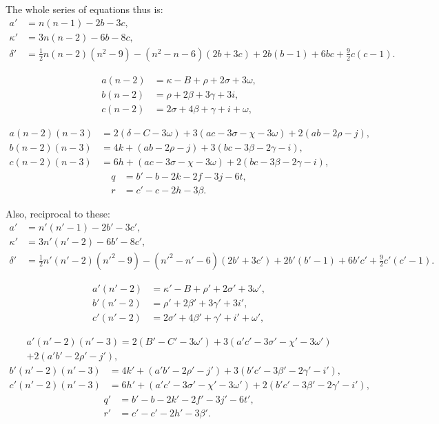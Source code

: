 \documentclass[11pt,a4paper]{article}
\theoremstyle{plain}
\theoremstyle{definition}
\theoremstyle{remark}
\begin{document}
The whole series of equations thus is:
\begin{align}
a' &= n(n-1)-2b-3c,\\
\kappa' &= 3n(n-2)-6b-8c,\\
\delta' &= \tfrac{1}{2}n(n-2)(n^2-9)-(n^2-n-6)(2b+3c)+2b(b-1)+6bc+\tfrac{9}{2}c(c-1).
\end{align}

\begin{align}
a(n-2) &= \kappa-B+\rho+2\sigma+3\omega,\tag{7}\\
b(n-2) &= \rho+2\beta+3\gamma+3i,\tag{8}\\
c(n-2) &= 2\sigma+4\beta+\gamma+i+\omega,\tag{9}
\end{align}

\begin{align}
a(n-2)(n-3) &= 2(\delta-C-3\omega)+3(ac-3\sigma-\chi-3\omega)+2(ab-2\rho-j),\tag{10}\\
b(n-2)(n-3) &= 4k+(ab-2\rho-j)+3(bc-3\beta-2\gamma-i),\tag{11}\\
c(n-2)(n-3) &= 6h+(ac-3\sigma-\chi-3\omega)+2(bc-3\beta-2\gamma-i),\tag{12}
\end{align}
\begin{align}
q &= b'-b-2k-2f-3j-6t,\tag{13}\\
r &= c'-c-2h-3\beta.\tag{14}
\end{align}

\newpage
\setcounter{page}{615}

Also, reciprocal to these:
\begin{align}
a' &= n'(n'-1)-2b'-3c',\tag{15}\\
\kappa' &= 3n'(n'-2)-6b'-8c',\tag{16}\\
\delta' &= \tfrac{1}{2}n'(n'-2)(n'^2-9)-(n'^2-n'-6)(2b'+3c')+2b'(b'-1)+6b'c'+\tfrac{9}{2}c'(c'-1).\tag{17}
\end{align}

\begin{align}
a'(n'-2) &= \kappa'-B+\rho'+2\sigma'+3\omega',\tag{18}\\
b'(n'-2) &= \rho'+2\beta'+3\gamma'+3i',\tag{19}\\
c'(n'-2) &= 2\sigma'+4\beta'+\gamma'+i'+\omega',\tag{20}
\end{align}

\begin{multline}
a'(n'-2)(n'-3) = 2(B'-C'-3\omega')+3(a'c'-3\sigma'-\chi'-3\omega')\\
+2(a'b'-2\rho'-j'),\tag{21}
\end{multline}
\begin{align}
b'(n'-2)(n'-3) &= 4k'+(a'b'-2\rho'-j')+3(b'c'-3\beta'-2\gamma'-i'),\tag{22}\\
c'(n'-2)(n'-3) &= 6h'+(a'c'-3\sigma'-\chi'-3\omega')+2(b'c'-3\beta'-2\gamma'-i'),\tag{23}
\end{align}
\begin{align}
q' &= b'-b-2k'-2f'-3j'-6t',\tag{24}\\
r' &= c'-c'-2h'-3\beta'.\tag{25}
\end{align}
\end{document}
